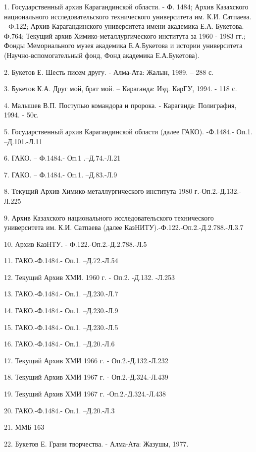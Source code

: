 \begin{noparindent}
1. Государственный архив Карагандинской области. - Ф. 1484; Архив
Казахского национального исследовательского технического университета
им. К.И. Сатпаева. - Ф.122; Архив Карагандинского университета имени
академика Е.А. Букетова. - Ф.764; Текущий архив Химико-металлургического
института за 1960 - 1983 гг.; Фонды Мемориального музея академика
Е.А.Букетова и истории университета (Научно-вспомогательный фонд, Фонд
академика Е.А.Букетова).

2. Букетов Е. Шесть писем другу. - Алма-Ата: Жалын, 1989. -- 288 с.

3. Букетов К.А. Друг мой, брат мой. -- Караганда: Изд. КарГУ, 1994. -
118 с.

4. Малышев В.П. Поступью командора и пророка. - Караганда: Полиграфия,
1994. - 50с.

5. Государственный архив Карагандинской области (далее ГАКО). -Ф.1484.-
Оп.1. --Д.101.-Л.11

6. ГАКО. -- Ф.1484.- Оп.1 .--Д.74.-Л.21

7. ГАКО. -- Ф.1484.- Оп.1. --Д.83.-Л.9

8. Текущий Архив Химико-металлургического института 1980
г.-Оп.2.-Д.132.-Л.225

9. Архив Казахского национального исследовательского технического
университета им. К.И. Сатпаева (далее
КазНИТУ).-Ф.122.-Оп.2.-Д.2.788.-Л.3.7

10. Архив КазНТУ. - Ф.122.-Оп.2.-Д.2.788.-Л.5

11. ГАКО.-Ф.1484.- Оп.1. --Д.72.-Л.54

12. Текущий Архив ХМИ. 1960 г. - Оп.2. -Д.132. -Л.253

13. ГАКО.-Ф.1484.- Оп.1. --Д.230.-Л.7

14. ГАКО.-Ф.1484.- Оп.1. --Д.230.-Л.9

15. ГАКО.-Ф.1484.- Оп.1. --Д.230.-Л.5

16. ГАКО.-Ф.1484.- Оп.1. --Д.20.-Л.6

17. Текущий Архив ХМИ 1966 г. - Оп.2.-Д.132.-Л.232

18. Текущий Архив ХМИ 1967 г. - Оп.2.-Д.324.-Л.439

19. Текущий Архив ХМИ 1967 г. -Оп.2.-Д.324.-Л.438

20. ГАКО.-Ф.1484.- Оп.1. --Д.20.-Л.3

21. ММБ 163

22. Букетов Е. Грани творчества. - Алма-Ата: Жазушы, 1977.
\end{noparindent}
